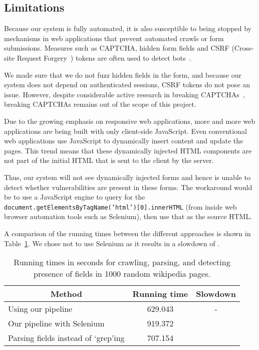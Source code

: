 \subsection[Limitations]{Limitations}
\label{limitations}
		Because our system is fully automated, it is also susceptible to being stopped by mechanisms in web applications that prevent automated crawls or form submissions. Measures such as CAPTCHA, hidden form fields and CSRF (Cross-site Request Forgery~\cite{csrf}) tokens are often used to detect bots~\cite{captchas3, captchas2}.

		We made sure that we do not fuzz hidden fields in the form, and because our system does not depend on authenticated sessions, CSRF tokens do not pose an issue. However, despite considerable active research in breaking CAPTCHAs~\cite{captchas2, captchas}, breaking CAPTCHAs remains out of the scope of this project. 
		
	   Due to the growing emphasis on responsive web applications, more and more web applications are being built with only client-side JavaScript. Even conventional web applications use JavaScript to dynamically insert content and update the pages. This trend means that these dynamically injected HTML components are not part of the initial HTML that is sent to the client by the server.

		Thus, our system will not see dynamically injected forms and hence is unable to detect whether \ehi vulnerabilities are present in these forms. The workaround would be to use a JavaScript engine to query for the \texttt{document.getElementsByTagName('html')[0].innerHTML} (from inside web browser automation tools such as Selenium), then use that as the source HTML. 
		
		A comparison of the running times between the different approaches is shown in Table~\ref{tab:perf}. We chose not to use Selenium as it results in a slowdown of \slowSelenium. 
		
		\begin{table}
			\centering
			\scriptsize
			\begin{tabular}{|p{4cm}|c|c|}
				\hline
				\multicolumn{1}{|c}{\textbf{Method}} &
				\multicolumn{1}{|c|}{\textbf{Running time}} &
				\multicolumn{1}{|c|}{\textbf{Slowdown}}
				\\
				\hline
				\centering Using our pipeline & 629.043 & - \\
				\hline
				\centering Our pipeline with Selenium & 919.372 & \slowSelenium \\
				\hline				
				\centering Parsing \email fields instead of `grep'ing& 707.154 & \slowParse \\								
				\hline
			\end{tabular}
			\caption[\titlecap{}]{Running times in seconds for crawling, parsing, and detecting presence of \email fields in 1000 random wikipedia pages.}
            \vspace{-5ex}
			\label{tab:perf}
		\end{table}

